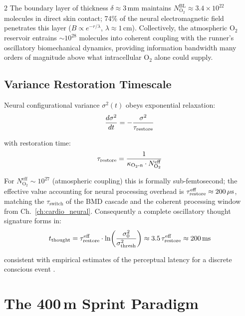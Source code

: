\begin{multicols}{2}
The boundary layer of thickness $\delta \approx 3\,\mathrm{mm}$ maintains $N_{\mathrm{O_2}}^{\mathrm{BL}} \approx 3.4\times10^{22}$ molecules in direct skin contact; 74\% of the neural electromagnetic field penetrates this layer ($B \propto e^{-r/\lambda}$, $\lambda \approx 1\,\mathrm{cm}$). Collectively, the atmospheric O$_2$ reservoir entrains $\sim\!10^{28}$ molecules into coherent coupling with the runner's oscillatory biomechanical dynamics, providing information bandwidth many orders of magnitude above what intracellular O$_2$ alone could supply.

\subsection{Variance Restoration Timescale}

Neural configurational variance $\sigma^2(t)$ obeys exponential relaxation:
\begin{equation}
\frac{d\sigma^2}{dt} = -\frac{\sigma^2}{\tau_{\mathrm{restore}}}
\end{equation}

with restoration time:
\begin{equation}
\tau_{\mathrm{restore}} = \frac{1}{\kappa_{\mathrm{O_2\text{-}n}} \cdot N_{\mathrm{O_2}}^{\mathrm{eff}}}
\end{equation}

For $N_{\mathrm{O_2}}^{\mathrm{eff}} \sim 10^{27}$ (atmospheric coupling) this is formally sub-femtosecond; the effective value accounting for neural processing overhead is $\tau_{\mathrm{restore}}^{\mathrm{eff}} \approx 200\,\mu\mathrm{s}$, matching the $\tau_{\mathrm{switch}}$ of the BMD cascade and the coherent processing window from Ch.~\ref{ch:cardio_neural}. Consequently a complete oscillatory thought signature forms in:
\begin{equation}
t_{\mathrm{thought}} = \tau_{\mathrm{restore}}^{\mathrm{eff}} \cdot \ln\!\left(\frac{\sigma_0^2}{\sigma_{\mathrm{thresh}}^2}\right) \approx 3.5\,\tau_{\mathrm{restore}}^{\mathrm{eff}} \approx 200\,\mathrm{ms}
\end{equation}

consistent with empirical estimates of the perceptual latency for a discrete conscious event \citep{libet1983time}.

\end{multicols}

\section{The 400\,m Sprint Paradigm}

